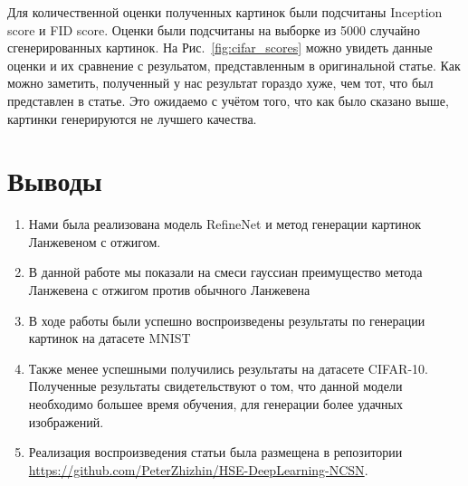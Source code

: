 \documentclass{article}
\begin{document}
Для количественной оценки полученных картинок были подсчитаны Inception score и
FID score.  Оценки были подсчитаны на выборке из 5000 случайно сгенерированных
картинок. На Рис.~\ref{fig:cifar_scores} можно увидеть данные оценки и их
сравнение с резульатом, представленным в оригинальной статье. Как можно
заметить, полученный у нас результат гораздо хуже, чем тот, что был представлен
в статье. Это ожидаемо с учётом того, что как было сказано выше, картинки
генерируются не лучшего качества.

\section{Выводы}


\begin{enumerate}
 \item Нами была реализована модель RefineNet и метод генерации картинок Ланжевеном с отжигом.
 \item  В данной работе мы показали на смеси гауссиан преимущество метода Ланжевена с отжигом против обычного Ланжевена
 \item В ходе работы были успешно воспроизведены результаты по генерации картинок на датасете MNIST
 \item Также менее успешными получились результаты на датасете CIFAR-10. Полученные результаты свидетельствуют о том, что данной модели необходимо большее время обучения, для генерации более удачных изображений.
 \item Реализация воспроизведения статьи была размещена в репозитории \url{https://github.com/PeterZhizhin/HSE-DeepLearning-NCSN}.
\end{enumerate}

 
 
\end{document}
